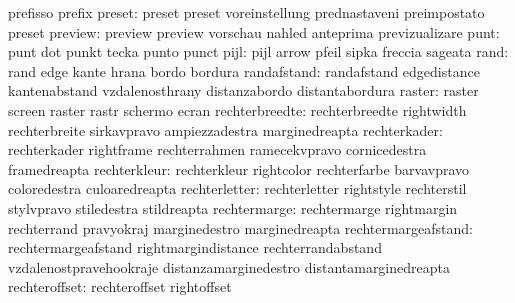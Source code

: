                            prefisso                  prefix
                   preset: preset                    preset
                           voreinstellung            prednastaveni
                           preimpostato              preset %
                  preview: preview                   preview
                           vorschau                  nahled
                           anteprima                 previzualizare
                     punt: punt                      dot
                           punkt                     tecka
                           punto                     punct
                     pijl: pijl                      arrow
                           pfeil                     sipka
                           freccia                   sageata
                     rand: rand                      edge
                           kante                     hrana
                           bordo                     bordura
              randafstand: randafstand               edgedistance
                           kantenabstand             vzdalenosthrany
                           distanzabordo             distantabordura
                   raster: raster                    screen
                           raster                    rastr
                           schermo                   ecran
           rechterbreedte: rechterbreedte            rightwidth
                           rechterbreite             sirkavpravo
                           ampiezzadestra            marginedreapta
             rechterkader: rechterkader              rightframe
                           rechterrahmen             ramecekvpravo
                           cornicedestra             framedreapta
             rechterkleur: rechterkleur              rightcolor
                           rechterfarbe              barvavpravo
                           coloredestra              culoaredreapta
            rechterletter: rechterletter             rightstyle
                           rechterstil               stylvpravo
                           stiledestra               stildreapta
             rechtermarge: rechtermarge              rightmargin
                           rechterrand               pravyokraj
                           marginedestro             marginedreapta
      rechtermargeafstand: rechtermargeafstand       rightmargindistance
                           rechterrandabstand        vzdalenostpravehookraje
                           distanzamarginedestro     distantamarginedreapta
            rechteroffset: rechteroffset             rightoffset
